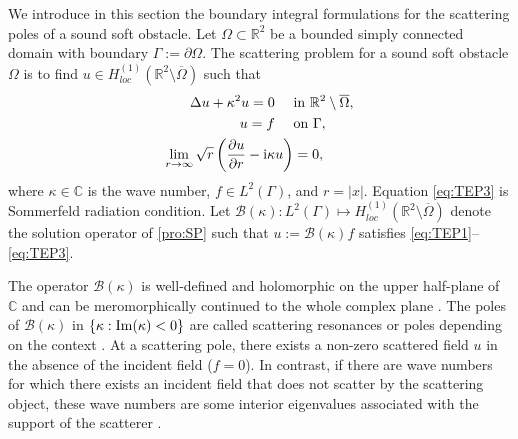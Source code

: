 \documentclass{article}
\newcommand{\abs}[1]{\left\vert#1\right\vert}
\newcommand{\set}[1]{\left\{#1\right\}}
\begin{document}
	
	We introduce in this section  the boundary integral formulations for the scattering poles of a sound soft obstacle.  	Let $\Omega\subset\mathbb{R}^2$ be a bounded simply connected  domain with boundary $\Gamma:=\partial\Omega$. The scattering problem for a sound soft obstacle $\Omega$ is to find $u\in H^{(1)}_{loc}(\mathbb{R}^2\setminus\overline{\Omega})$ such that
	\begin{subequations}\label{pro:SP}
		\begin{align}
			\Delta u +\kappa^2 u=0 \quad  ~&\text{in}~\mathbb{R}^2\setminus\overline{\Omega}, \label{eq:TEP1}\\
			u=f \quad ~&\text{on}~\Gamma,\label{eq:TEP2}\\
			\lim_{r\to\infty}\sqrt{r}\left(\frac{\partial u}{\partial r}-{\rm i}\kappa u \right)&=0, \label{eq:TEP3}
		\end{align}
	\end{subequations}
	where $\kappa\in\mathbb{C}$ is the wave number, $f\in L^2(\Gamma)$, and $r=\abs{x}$. Equation \eqref{eq:TEP3} is Sommerfeld radiation condition. Let $\mathcal{B}(\kappa): L^2(\Gamma)\mapsto H^{(1)}_{loc}(\mathbb{R}^2\setminus\overline{\Omega})$ denote the solution operator of \eqref{pro:SP} such that  $u:=\mathcal{B}(\kappa)f$ satisfies \eqref{eq:TEP1}--\eqref{eq:TEP3}. 
	
	The operator $\mathcal{B}(\kappa)$ is well-defined and holomorphic on the upper half-plane of $\mathbb{C}$ and can be meromorphically continued to the whole complex plane \cite{Taylor1996}. The poles of $\mathcal{B}(\kappa)$ in $\set{\kappa:\rm{Im}(\kappa)<0}$ are called scattering resonances or poles depending on the context \cite{Labreuche1998siamJAM,Ralston1972CPAM}. At a scattering pole, there exists a non-zero scattered field $u$ in the absence of the incident field ($f=0$).  In contrast, if there are wave numbers for which there exists an incident field that does not scatter by the scattering object, these wave numbers are some interior eigenvalues associated with the support of the scatterer \cite{CCH2020}.
	
	
	
\end{document}
